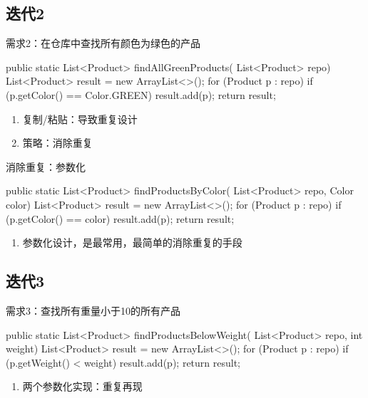 \subsection{迭代2}

\begin{frame}[fragile]{需求2：在仓库中查找所有颜色为绿色的产品}
  \begin{java}
public static List<Product> findAllGreenProducts(
  List<Product> repo) {
  List<Product> result = new ArrayList<>();
  for (Product p : repo) {
    if (p.getColor() == Color.GREEN) {
      result.add(p);
    }
  }
  return result;
}
  \end{java}

\begin{enumerate}
  \item 复制/粘贴：导致重复设计
  \item 策略：消除重复
\end{enumerate}  
\end{frame}

\begin{frame}[fragile]{消除重复：参数化}
  \begin{java}
public static List<Product> findProductsByColor(
  List<Product> repo, Color color) {
  List<Product> result = new ArrayList<>();
  for (Product p : repo) {
    if (p.getColor() == color) {
      result.add(p);
    }
  }
  return result;
}
  \end{java}

\begin{enumerate}
  \item 参数化设计，是最常用，最简单的消除重复的手段
\end{enumerate}  
\end{frame}

\subsection{迭代3}

\begin{frame}[fragile]{需求3：查找所有重量小于10的所有产品}
  \begin{java}
public static List<Product> findProductsBelowWeight(
  List<Product> repo, int weight) {
  List<Product> result = new ArrayList<>();
  for (Product p : repo) {
    if (p.getWeight() < weight) {
      result.add(p);
    }
  }
  return result;
}
  \end{java}

\begin{enumerate}
  \item 两个参数化实现：重复再现
\end{enumerate}  
\end{frame}

